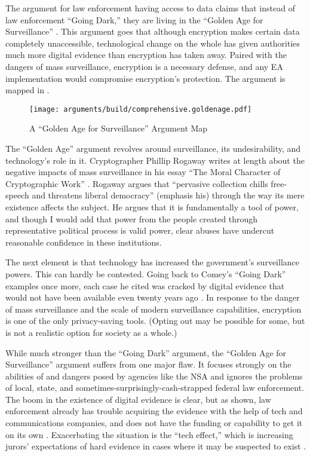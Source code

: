 
The argument for law enforcement having  access to data claims that instead of law enforcement ``Going
Dark,'' they are living in the ``Golden Age for Surveillance'' \cite{swire_encryption_2011}. This argument goes that
although encryption makes certain data completely unaccessible, technological change on the whole has given authorities
much more digital evidence than encryption has taken away. Paired with the dangers of mass surveillance, encryption is
a necessary defense, and any \ac{EA} implementation would compromise encryption's protection. The argument is mapped in
.

\begin{figure}[p!]
  \centering\CaptionFontSize
  \texttt{[image: arguments/build/comprehensive.goldenage.pdf]}
  \caption{A ``Golden Age for Surveillance'' Argument Map}
  \label{fig-arg-golden-age}
\end{figure}

The ``Golden Age'' argument revolves around surveillance, its undesirability, and technology's role in it. Cryptographer
Phillip Rogaway writes at length about the negative impacts of mass surveillance in his essay ``The Moral Character of
Cryptographic Work'' \cite{rogaway_moral_2015}. Rogaway argues that ``pervasive collection  chills
free-speech and threatens liberal democracy'' (emphasis his) through the way its mere existence affects the subject. He
argues that it is fundamentally a tool of power, and though I would add that power from the people created through
representative political process is valid power, clear abuses have undercut reasonable confidence in these institutions.

The next element is that technology has increased the government's surveillance powers. This can hardly be contested.
Going back to Comey's ``Going Dark'' examples once more, each case he cited was cracked by digital evidence that would
not have been available even twenty years ago \cite{comey_2014}. In response to the danger of mass surveillance and the
scale of modern surveillance capabilities, encryption is one of the only privacy-saving tools. (Opting out may be
possible for some, but is not a realistic option for society as a whole.)

While much stronger than the ``Going Dark'' argument, the ``Golden Age for Surveillance'' argument suffers from one
major flaw. It focuses strongly on the abilities of and dangers posed by agencies like the \ac{NSA} and ignores the
problems of local, state, and sometimes-surprisingly-cash-strapped federal law enforcement. The boom in the existence of
digital evidence is clear, but as shown, law enforcement already has trouble acquiring the evidence with the help of
tech and communications companies, and does not have the funding or capability to get it on its own \cite{carter_2018}.
Exacerbating the situation is the ``tech effect,'' which is increasing jurors' expectations of hard evidence in cases
where it may be suspected to exist \cite{shelton_study_2006}.

